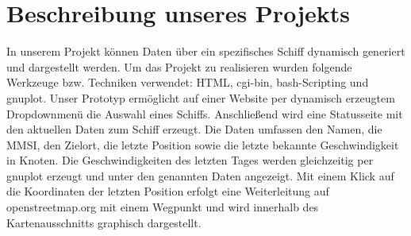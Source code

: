 \section*{Beschreibung unseres Projekts}
In unserem Projekt können Daten über ein spezifisches Schiff dynamisch generiert und dargestellt werden. Um das Projekt zu realisieren wurden folgende Werkzeuge bzw. Techniken verwendet: HTML, cgi-bin, bash-Scripting und gnuplot. Unser Prototyp ermöglicht auf einer Website per dynamisch erzeugtem Dropdownmenü die Auswahl eines Schiffs. Anschließend wird eine Statusseite mit den aktuellen Daten zum Schiff erzeugt. Die Daten umfassen den Namen, die MMSI, den Zielort, die letzte Position sowie die letzte bekannte Geschwindigkeit in Knoten. Die Geschwindigkeiten des letzten Tages werden gleichzeitig per gnuplot erzeugt und unter den genannten Daten angezeigt. Mit einem Klick auf die Koordinaten der letzten Position erfolgt eine Weiterleitung auf openstreetmap.org mit einem Wegpunkt und wird innerhalb des Kartenausschnitts graphisch dargestellt.
